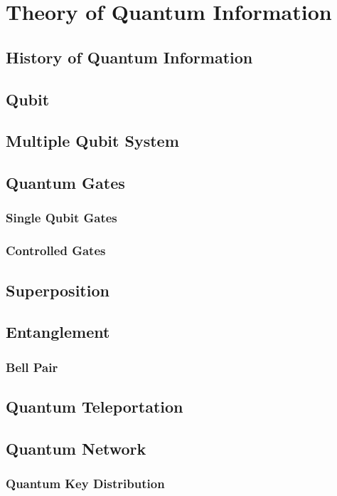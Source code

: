 \chapter{Theory of Quantum Information}
\label{theory_of_quantum_information}
\section{History of Quantum Information}

\section{Qubit}

\section{Multiple Qubit System}

\section{Quantum Gates}
\subsection{Single Qubit Gates}
\subsection{Controlled Gates}

\section{Superposition}

\section{Entanglement}
\subsection{Bell Pair}

\section{Quantum Teleportation}

\section{Quantum Network}
\subsection{Quantum Key Distribution}
